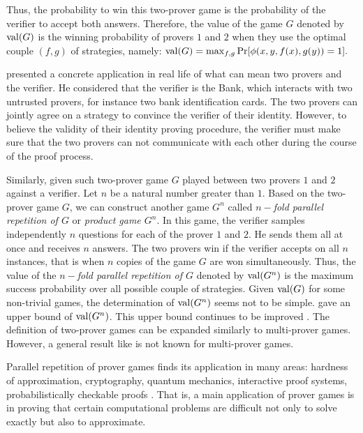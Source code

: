 Thus, the probability to win  this two-prover game is the probability of the verifier to accept both answers.  Therefore, the value of the game $G$ denoted by $\mathrm{val} (G)$ is the winning probability of provers $1$ and $2$ when they use the optimal couple $(f,g)$ of strategies, namely: $\mathrm{val} (G)= \max_{f,g} \mathrm{Pr}[\phi (x,y,f(x),g(y))=1].$ 

 \cite*{ben1990efficient} presented a concrete application in real life of what can mean  two provers and the verifier. He considered that the verifier is the Bank, which interacts with two untrusted provers, for instance two bank identification cards. The two provers can jointly agree on a strategy to convince the verifier of their identity. However, to believe the validity of their identity proving procedure, the verifier must make sure that the two provers can not communicate with each other during the course of the proof process.

Similarly, given such two-prover game $G$ played between two provers $1$ and $2$ against a verifier. Let $n$ be a natural number greater than $1.$ Based on the two-prover game $G$,
we can construct another game $G^n$ called $n-$\textit{fold parallel repetition of $G$} or \textit{product game $G^n$}. In this game, the verifier samples independently $n$ questions for each of the prover $1$ and $2.$ He sends them all at once and receives $n$ answers. The two provers win if the verifier accepts on all $n$ instances, that is  when $n$ copies of the game $G$ are won simultaneously.
Thus, the value of the $n-$\textit{fold parallel repetition of $G$} denoted by $\mathrm{val} (G^n)$ is the maximum success probability over all possible couple of strategies. Given $\mathrm{val} (G)$ for some non-trivial games, the determination of $\mathrm{val} (G^n)$ seems not to be  simple. \cite{raz1998parallel} gave an upper bound of $\mathrm{val} (G^n)$.
This upper bound  continues to be improved 
\citep*{holenstein2007parallel, raz2012strong, dinur2014analytical, dinur2016multiplayer}.
The definition of two-prover games can be expanded similarly to multi-prover games. However, a general result like \cite{raz1998parallel} is not known for multi-prover games.

Parallel repetition of prover games finds its application in many areas: hardness of approximation, cryptography, quantum mechanics, interactive proof systems, probabilistically checkable proofs  \cite*{tamaki2015parallel, dinur2016multiplayer}. 
 That is, a main application of prover games is in proving that certain computational problems are difficult not only to solve exactly but also to approximate.

